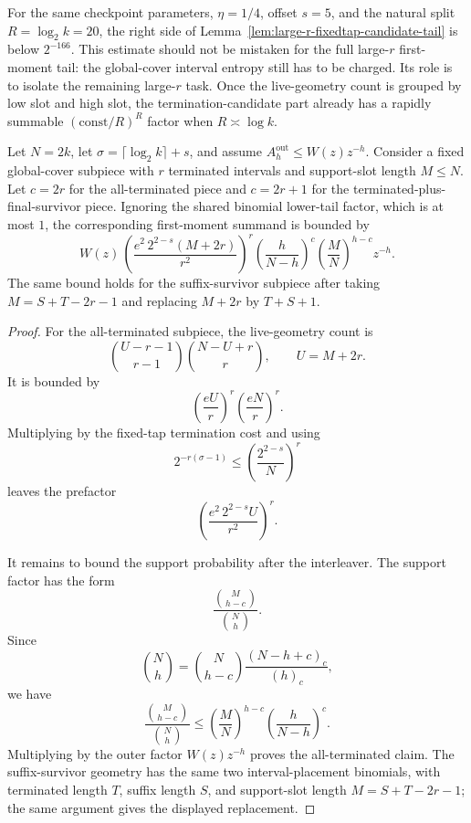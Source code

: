 For the same checkpoint parameters, \(\eta=1/4\), offset \(s=5\), and the natural split \(R=\log_2 k=20\), the right
side of Lemma~\ref{lem:large-r-fixedtap-candidate-tail} is below \(2^{-166}\).  This estimate should not be mistaken
for the full large-\(r\) first-moment tail: the global-cover interval entropy still has to be charged.  Its role is to
isolate the remaining large-\(r\) task.  Once the live-geometry count is grouped by low slot and high slot, the
termination-candidate part already has a rapidly summable \((\mathrm{const}/R)^R\) factor when \(R\asymp\log k\).

\begin{lemma}
\label{lem:large-r-low-slot-ledger}
Let \(N=2k\), let \(\sigma=\lceil\log_2 k\rceil+s\), and assume
\(A_h^{\mathrm{out}}\le W(z)z^{-h}\).  Consider a fixed global-cover subpiece with \(r\) terminated intervals and
support-slot length \(M\le N\).  Let \(c=2r\) for the all-terminated piece and \(c=2r+1\) for the
terminated-plus-final-survivor piece.  Ignoring the shared binomial lower-tail factor, which is at most \(1\), the
corresponding first-moment summand is bounded by
\[
W(z)\,
\left(
\frac{e^2\,2^{2-s}(M+2r)}{r^2}
\right)^r
\left(\frac{h}{N-h}\right)^c
\left(\frac{M}{N}\right)^{h-c}
z^{-h}.
\]
The same bound holds for the suffix-survivor subpiece after taking \(M=S+T-2r-1\) and replacing \(M+2r\) by
\(T+S+1\).
\end{lemma}

\begin{proof}
For the all-terminated subpiece, the live-geometry count is
\[
\binom{U-r-1}{r-1}\binom{N-U+r}{r},
\qquad U=M+2r.
\]
It is bounded by
\[
\left(\frac{eU}{r}\right)^r\left(\frac{eN}{r}\right)^r.
\]
Multiplying by the fixed-tap termination cost and using
\[
2^{-r(\sigma-1)}
\le
\left(\frac{2^{2-s}}{N}\right)^r
\]
leaves the prefactor
\[
\left(\frac{e^2\,2^{2-s}U}{r^2}\right)^r.
\]

It remains to bound the support probability after the interleaver.  The support factor has the form
\[
\frac{\binom{M}{h-c}}{\binom{N}{h}}.
\]
Since
\[
\binom{N}{h}
=
\binom{N}{h-c}\frac{(N-h+c)_c}{(h)_c},
\]
we have
\[
\frac{\binom{M}{h-c}}{\binom{N}{h}}
\le
\left(\frac{M}{N}\right)^{h-c}
\left(\frac{h}{N-h}\right)^c.
\]
Multiplying by the outer factor \(W(z)z^{-h}\) proves the all-terminated claim.  The suffix-survivor geometry has the
same two interval-placement binomials, with terminated length \(T\), suffix length \(S\), and support-slot length
\(M=S+T-2r-1\); the same argument gives the displayed replacement.
\end{proof}

